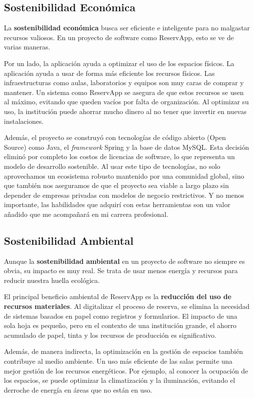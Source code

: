 \subsection{Sostenibilidad Económica}
La \textbf{sostenibilidad económica} busca ser eficiente e inteligente para no malgastar recursos valiosos. En un proyecto de software como ReservApp, esto se ve de varias maneras.

Por un lado, la aplicación ayuda a optimizar el uso de los espacios físicos. La aplicación ayuda a usar de forma más eficiente los recursos físicos. Las infraestructuras como aulas, laboratorios y equipos son muy caras de comprar y mantener. Un sistema como ReservApp se asegura de que estos recursos se usen al máximo, evitando que queden vacíos por falta de organización. Al optimizar su uso, la institución puede ahorrar mucho dinero al no tener que invertir en nuevas instalaciones.

Además, el proyecto se construyó con tecnologías de código abierto (Open Source) como Java, el \emph{framework} Spring y la base de datos MySQL. Esta decisión eliminó por completo los costos de licencias de software, lo que representa un modelo de desarrollo sostenible. Al usar este tipo de tecnologías, no solo aprovechamos un ecosistema robusto mantenido por una comunidad global, sino que también nos aseguramos de que el proyecto sea viable a largo plazo sin depender de empresas privadas con modelos de negocio restrictivos. Y no menos importante, las habilidades que adquirí con estas herramientas son un valor añadido que me acompañará en mi carrera profesional.

\subsection{Sostenibilidad Ambiental}
Aunque la \textbf{sostenibilidad ambiental} en un proyecto de software no siempre es obvia, su impacto es muy real. Se trata de usar menos energía y recursos para reducir nuestra huella ecológica.

El principal beneficio ambiental de ReservApp es la \textbf{reducción del uso de recursos materiales}. Al digitalizar el proceso de reserva, se elimina la necesidad de sistemas basados en papel como registros y formularios. El impacto de una sola hoja es pequeño, pero en el contexto de una institución grande, el ahorro acumulado de papel, tinta y los recursos de producción es significativo.

Además, de manera indirecta, la optimización en la gestión de espacios también contribuye al medio ambiente. Un uso más eficiente de las salas permite una mejor gestión de los recursos energéticos. Por ejemplo, al conocer la ocupación de los espacios, se puede optimizar la climatización y la iluminación, evitando el derroche de energía en áreas que no están en uso.

